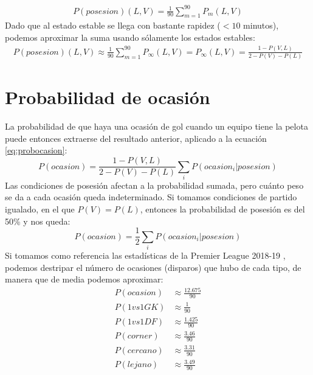 \documentclass[a4paper,9pt]{article}
\begin{document}
\begin{align}
	P(posesion)(L,V)=\frac{1}{90}\sum_{m=1}^{90}P_m(L,V)
\end{align}
Dado que al estado estable se llega con bastante rapidez ($<10$ minutos), podemos aproximar la suma usando sólamente los estados estables:
\begin{align}
	P(posesion)(L,V)\approx\frac{1}{90}\sum_{m=1}^{90}P_\infty(L,V)=P_\infty(L,V)=\frac{1-P(V,L)}{2-P(V)-P(L)}
\end{align}

\section{Probabilidad de ocasión}\label{sec:ProbOcasion}
\def \Pocasion {\ensuremath{\frac{12.675}{90}}}
\def \PvsGK {\ensuremath{\frac{1}{90}}}
\def \PvsDF {\ensuremath{\frac{1.425}{90}}}
\def \Pcorner {\ensuremath{\frac{3.46}{90}}}
\def \Pclose {\ensuremath{\frac{3.31}{90}}}
\def \Pfar {\ensuremath{\frac{3.49}{90}}}
La probabilidad de que haya una ocasión de gol cuando un equipo tiene la pelota puede entonces extraerse del resultado anterior, aplicado a la ecuación \ref{eq:probocasion}:
\begin{equation}\label{eq:probocasion2}
	P(ocasion)=\frac{1-P(V,L)}{2-P(V)-P(L)}\sum_i{P(ocasion_i|posesion)}
\end{equation}
Las condiciones de posesión afectan a la probabilidad sumada, pero cuánto peso se da a cada ocasión queda indeterminado. Si tomamos condiciones de partido igualado, en el que $P(V)=P(L)$, entonces la probabilidad de posesión es del 50\% y nos queda:
\begin{equation}
	P(ocasion)=\frac{1}{2}\sum_i{P(ocasion_i|posesion)}
\end{equation}
Si tomamos como referencia las estadísticas de la Premier League 2018-19 \cite{PremierLeague}, podemos destripar el número de ocasiones (disparos) que hubo de cada tipo, de manera que de media podemos aproximar:
\begin{align}
	P(ocasion)&\approx\Pocasion\\
	P(1vs1GK)&\approx\PvsGK\\
	P(1vs1DF)&\approx\PvsDF\\
	P(corner)&\approx\Pcorner\\
	P(cercano)&\approx\Pclose\\
	P(lejano)&\approx\Pfar
\end{align}
\end{document}
